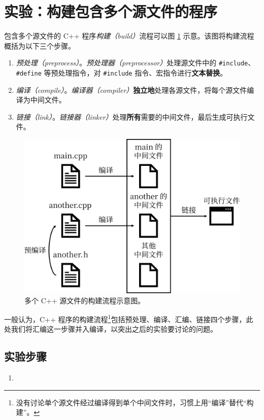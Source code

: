 
\section{实验：构建包含多个源文件的程序}

包含多个源文件的 C++ 程序\emph{构建（build）}流程可以图 \ref{fig:build-flow} 示意。该图将构建流程概括为以下三个步骤。

\begin{enumerate}
	\item \emph{预处理（preprocess）}。\emph{预处理器（preprocessor）}处理源文件中的 \lstinline[language={[17]C++}]{#include}、\lstinline[language={[17]C++}]{#define} 等预处理指令，对 \lstinline[language={[17]C++}]{#include} 指令、宏指令进行\textbf{文本替换}。
	\item \emph{编译（compile）}。\emph{编译器（compiler）}\textbf{独立地}处理各源文件，将每个源文件编译为中间文件。
	\item \emph{链接（link）}。\emph{链接器（linker）}处理\textbf{所有}需要的中间文件，最后生成可执行文件。
\end{enumerate}

\begin{figure}
	\centering
	\includegraphics[scale=0.15]{assets/build-flow}
	\caption{多个 C++ 源文件的构建流程示意图。}
	\label{fig:build-flow}
\end{figure}

一般认为，C++ 程序的构建流程\footnote{没有讨论单个源文件经过编译得到单个中间文件时，习惯上用“编译”替代“构建”。}包括预处理、编译、汇编、链接四个步骤，此处我们将汇编这一步骤并入编译，以突出之后的实验要讨论的问题。

\subsection*{实验步骤}

\begin{enumerate}
	\item
\end{enumerate}
